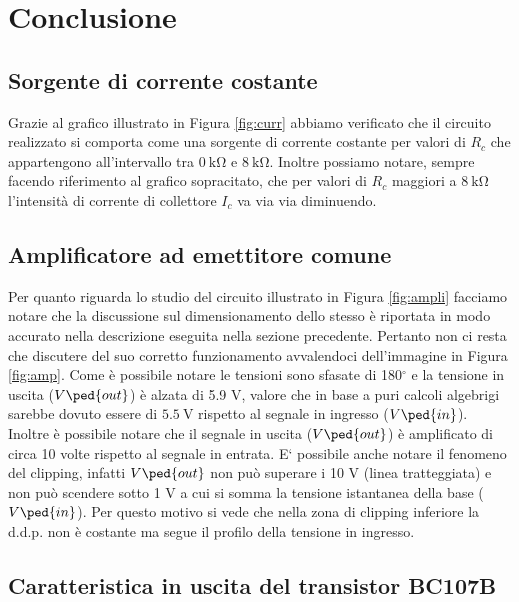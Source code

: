 \section*{Conclusione}

\subsection*{Sorgente di corrente costante}

Grazie al grafico illustrato in Figura \ref{fig:curr} abbiamo verificato che il circuito realizzato si comporta come una sorgente di corrente costante per valori di $R_c$ che appartengono all'intervallo tra $\SI{0}{\kilo\ohm}$ e $\SI{8}{\kilo\ohm}$. Inoltre possiamo notare, sempre facendo riferimento al grafico sopracitato, che per valori di $R_c$ maggiori a $\SI{8}{\kilo\ohm}$ l'intensità di corrente di collettore $I_c$ va via via diminuendo.

\subsection*{Amplificatore ad emettitore comune}

Per quanto riguarda lo studio del circuito illustrato in Figura \ref{fig:ampli} facciamo notare che la discussione sul dimensionamento dello stesso è riportata in modo accurato nella descrizione eseguita nella sezione precedente. Pertanto non ci resta che discutere del suo corretto funzionamento avvalendoci dell'immagine in Figura \ref{fig:amp}. Come è possibile notare le tensioni sono sfasate di 180$^\circ$ e la tensione in uscita ($V\ped{out}$) è alzata di 5.9 V, valore che in base a puri calcoli algebrigi sarebbe dovuto essere di $\SI{5.5}{\volt}$ rispetto al segnale in ingresso ($V\ped{in}$).
Inoltre è possibile notare che il segnale in uscita ($V\ped{out}$) è amplificato di circa 10 volte rispetto al segnale in entrata.
E` possibile anche notare il fenomeno del clipping, infatti $V\ped{out}$ non può superare i 10 V (linea tratteggiata) e non può scendere sotto 1 V a cui si somma la tensione istantanea della base ($V\ped{in}$). Per questo motivo si vede che nella zona di clipping inferiore la d.d.p. non è costante ma segue il profilo della tensione in ingresso.

\subsection*{Caratteristica in uscita del transistor BC107B}

